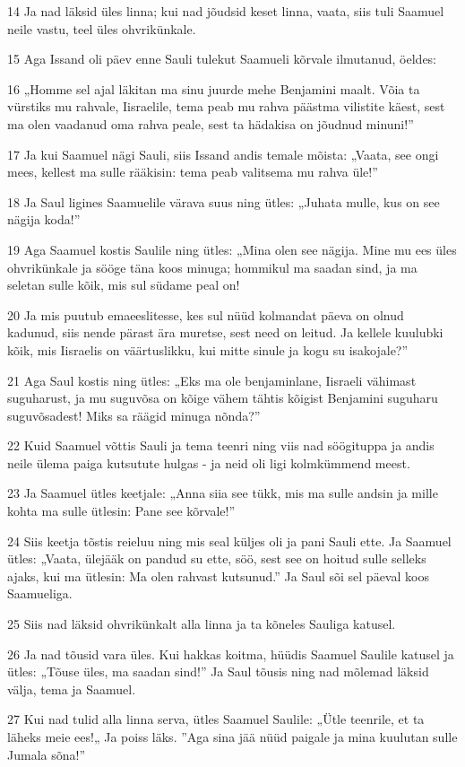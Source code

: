 \par 14 Ja nad läksid üles linna; kui nad jõudsid keset linna, vaata, siis tuli Saamuel neile vastu, teel üles ohvrikünkale.
\par 15 Aga Issand oli päev enne Sauli tulekut Saamueli kõrvale ilmutanud, öeldes:
\par 16 „Homme sel ajal läkitan ma sinu juurde mehe Benjamini maalt. Võia ta vürstiks mu rahvale, Iisraelile, tema peab mu rahva päästma vilistite käest, sest ma olen vaadanud oma rahva peale, sest ta hädakisa on jõudnud minuni!”
\par 17 Ja kui Saamuel nägi Sauli, siis Issand andis temale mõista: „Vaata, see ongi mees, kellest ma sulle rääkisin: tema peab valitsema mu rahva üle!”
\par 18 Ja Saul ligines Saamuelile värava suus ning ütles: „Juhata mulle, kus on see nägija koda!”
\par 19 Aga Saamuel kostis Saulile ning ütles: „Mina olen see nägija. Mine mu ees üles ohvrikünkale ja sööge täna koos minuga; hommikul ma saadan sind, ja ma seletan sulle kõik, mis sul südame peal on!
\par 20 Ja mis puutub emaeeslitesse, kes sul nüüd kolmandat päeva on olnud kadunud, siis nende pärast ära muretse, sest need on leitud. Ja kellele kuulubki kõik, mis Iisraelis on väärtuslikku, kui mitte sinule ja kogu su isakojale?”
\par 21 Aga Saul kostis ning ütles: „Eks ma ole benjaminlane, Iisraeli vähimast suguharust, ja mu suguvõsa on kõige vähem tähtis kõigist Benjamini suguharu suguvõsadest! Miks sa räägid minuga nõnda?”
\par 22 Kuid Saamuel võttis Sauli ja tema teenri ning viis nad söögituppa ja andis neile ülema paiga kutsutute hulgas - ja neid oli ligi kolmkümmend meest.
\par 23 Ja Saamuel ütles keetjale: „Anna siia see tükk, mis ma sulle andsin ja mille kohta ma sulle ütlesin: Pane see kõrvale!”
\par 24 Siis keetja tõstis reieluu ning mis seal küljes oli ja pani Sauli ette. Ja Saamuel ütles: „Vaata, ülejääk on pandud su ette, söö, sest see on hoitud sulle selleks ajaks, kui ma ütlesin: Ma olen rahvast kutsunud.” Ja Saul sõi sel päeval koos Saamueliga.
\par 25 Siis nad läksid ohvrikünkalt alla linna ja ta kõneles Sauliga katusel.
\par 26 Ja nad tõusid vara üles. Kui hakkas koitma, hüüdis Saamuel Saulile katusel ja ütles: „Tõuse üles, ma saadan sind!” Ja Saul tõusis ning nad mõlemad läksid välja, tema ja Saamuel.
\par 27 Kui nad tulid alla linna serva, ütles Saamuel Saulile: „Ütle teenrile, et ta läheks meie ees!„ Ja poiss läks. ”Aga sina jää nüüd paigale ja mina kuulutan sulle Jumala sõna!”

